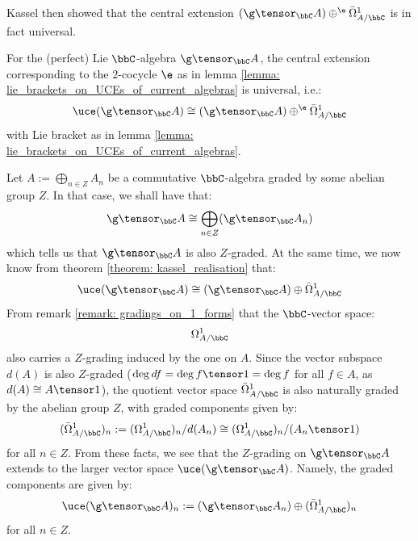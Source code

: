         Kassel then showed that the central extension $(\g \tensor_{\bbC} A) \oplus^{\e} \bar{\Omega}^1_{A/\bbC}$ is in fact universal.
        \begin{theorem} \label{theorem: kassel_realisation}
            \cite[Corollary 3.5]{kassel_universal_central_extensions_of_lie_algebras} For the (perfect) Lie $\bbC$-algebra $\g \tensor_{\bbC} A$, the central extension corresponding to the $2$-cocycle $\e$ as in lemma \ref{lemma: lie_brackets_on_UCEs_of_current_algebras} is universal, i.e.:
                $$\uce(\g \tensor_{\bbC} A) \cong (\g \tensor_{\bbC} A) \oplus^{\e} \bar{\Omega}^1_{A/\bbC}$$
            with Lie bracket as in lemma \ref{lemma: lie_brackets_on_UCEs_of_current_algebras}.
        \end{theorem}

        \begin{remark} \label{remark: induced_gradings_on_UCEs}
            Let $A := \bigoplus_{n \in Z} A_n$ be a commutative $\bbC$-algebra graded by some abelian group $Z$. In that case, we shall have that:
                $$\g \tensor_{\bbC} A \cong \bigoplus_{n \in Z} (\g \tensor_{\bbC} A_n)$$
            which tells us that $\g \tensor_{\bbC} A$ is also $Z$-graded. At the same time, we now know from theorem \ref{theorem: kassel_realisation} that:
                $$\uce(\g \tensor_{\bbC} A) \cong (\g \tensor_{\bbC} A) \oplus \bar{\Omega}^1_{A/\bbC}$$
            From remark \ref{remark: gradings_on_1_forms} that the $\bbC$-vector space:
                $$\Omega^1_{A/\bbC}$$
            also carries a $Z$-grading induced by the one on $A$. Since the vector subspace $d(A)$ is also $Z$-graded ($\deg df = \deg f \tensor 1 = \deg f$ for all $f \in A$, as $d(A) \cong A \tensor 1$), the quotient vector space $\bar{\Omega}^1_{A/\bbC}$ is also naturally graded by the abelian group $Z$, with graded components given by:
                $$(\bar{\Omega}^1_{A/\bbC})_n := (\Omega^1_{A/\bbC})_n/d(A_n) \cong (\Omega^1_{A/\bbC})_n/(A_n \tensor 1)$$
            for all $n \in Z$. From these facts, we see that the $Z$-grading on $\g \tensor_{\bbC} A$ extends to the larger vector space $\uce(\g \tensor_{\bbC} A)$. Namely, the graded components are given by:
                $$\uce(\g \tensor_{\bbC} A)_n := (\g \tensor_{\bbC} A_n) \oplus (\bar{\Omega}^1_{A/\bbC})_n$$
            for all $n \in Z$.
        \end{remark}